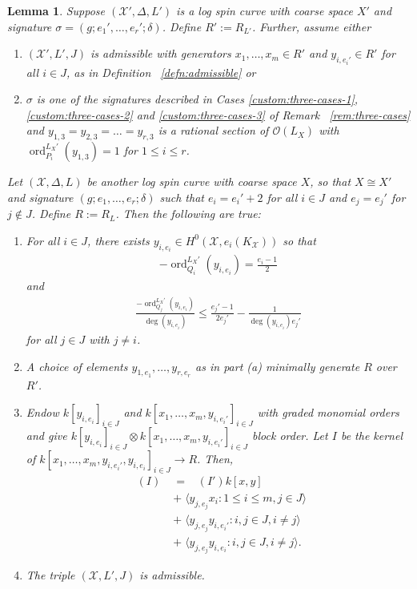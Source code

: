 \documentclass{amsart}
\theoremstyle{plain}
\newtheorem{lem}[thm]{Lemma}
\theoremstyle{definition}
\theoremstyle{remark}
\numberwithin{equation}{section}
\newcommand\sco{{\mathscr O}}
\DeclareMathOperator{\ord}{ord}
\newcommand\sx{\mathscr X}
\newcommand \subhalf[1]{\frac{{#1} - 1}{2{#1}}}
\newcommand{\halfcan}{L}
\DeclareMathOperator{\initial}{in_\prec}
\begin{document}
\begin{lem}
\label{lem:raise-stacky-order}
Suppose $(\sx', \Delta, \halfcan')$ is a log spin curve with coarse
space $X'$ and signature $\sigma = (g; e_1', \ldots, e_r'; \delta)$.  Define $R':= R_{\halfcan'}$.  Further, assume either 
\begin{enumerate}
	\item $(\sx', \halfcan', J)$ is admissible with generators $x_1,
		\ldots, x_m \in R'$ and $y_{i, e_i'} \in R' $ for all $i \in J$, as 
		in Definition ~\ref{defn:admissible} or
	\item $\sigma$ is one of the signatures described in Cases
		\ref{custom:three-cases-1}, \ref{custom:three-cases-2} and
		\ref{custom:three-cases-3} of Remark ~\ref{rem:three-cases} and
		$y_{1, 3} = y_{2,3} = \ldots= y_{r,3}$ is a rational section of
		$\sco(\halfcan_X)$ with $\ord_{P_i}^{\halfcan_X'}(y_{1,3}) = 1$
		for $1 \leq  i \leq r$.
\end{enumerate}
Let
$(\sx, \Delta, \halfcan)$ be another log spin curve
with coarse space $X$, so that $X \cong X'$ and signature $(g; e_1, \ldots, e_r;
\delta)$ such that $e_i = e_i' + 2$ for all $i \in J$ and
$e_j = e_j'$ for $j \notin J$. Define $R := R_\halfcan$.  Then the following are true:
\begin{enumerate}
	\item[(a)] For all $i \in J$, there exists $y_{i, e_i} \in
		H^0(\sx, e_i(K_\sx))$ so that
		\begin{align*}
			-\ord_{Q_i}
^{\halfcan_X'}(y_{i, e_i}) = \frac{e_i - 1}{2}
		\end{align*}
		and
		\begin{align*}
			\frac{-\ord_{Q_j}
^{\halfcan_X'}(y_{i, e_i})}{\deg (y_{i, e_i})} \leq 
\subhalf{
			e_j'} - \frac{1}{\deg(y_{i, e_i})e_j'}
		\end{align*}
		for all $j \in J$ with $j \neq i$.
	\item[(b)] 
	
		A choice of elements $y_{1, e_1}, \ldots, y_{r, e_r}$ as in part (a) minimally
		generate $R$ over $R'$.
	\item[(c)] Endow $k[y_{i, e_i}]_{i\in J}$ and $ k[x_1, \ldots, x_m, y_{i, e_i'}]_{i\in J}$ with graded monomial orders and give 
$k[y_{i, e_i}]_{i\in J} \otimes k[x_1, \ldots, x_m, y_{i, e_i'}]_{i\in J}$
 block order.  Let $I$ be the kernel of $k[x_1, \ldots, x_m, y_{i, e_i'}, y_{i, e_i}]_{i\in J} \to R$.
  Then,
		\begin{align*}
			\initial(I) \;	&= \; \initial(I')k[x, y] \\
					&+ \; \langle y_{j, e_j}x_i  : 1\le i \le m, j\in J\rangle \\
					&+ \; \langle y_{j, e_j}y_{i, e_i'}: i,j\in J, i\ne j\rangle \\
					&+ \; \langle y_{j,e_j}y_{i,e_i}: i,j\in J, i\ne j\rangle.
		\end{align*}
	\item[(d)] The triple $(\sx, \halfcan', J)$ is admissible.
\end{enumerate}
\end{lem}
\end{document}
